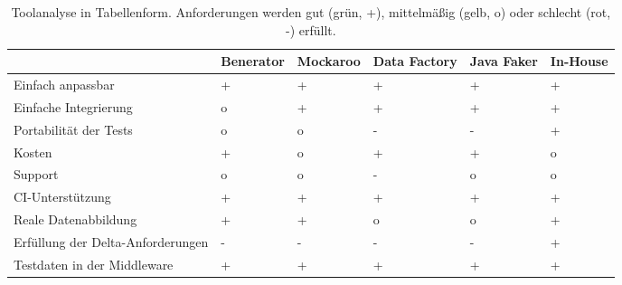 \begin{sidewaystable}[h!p]
    \begin{center}
        \begin{tabular}{| >{\raggedright\arraybackslash}m{16em} | >{\raggedright\arraybackslash}m{6em} | >{\raggedright\arraybackslash}m{6em} | >{\raggedright\arraybackslash}m{6em} | >{\raggedright\arraybackslash}m{6em} | >{\raggedright\arraybackslash}m{6em} |}
            \hline
              & Benerator & Mockaroo & Data Factory & Java Faker & In-House \\ 
             \hline\hline
             Einfach anpassbar & \cellcolor{good}+ & \cellcolor{good}+ & \cellcolor{good}+ & \cellcolor{good}+ & \cellcolor{good}+ \\ 
             \hline
             Einfache Integrierung & \cellcolor{neutral}o & \cellcolor{good}+ & \cellcolor{good}+ & \cellcolor{good}+ & \cellcolor{good}+ \\ 
             \hline
             Portabilität der Tests & \cellcolor{neutral}o & \cellcolor{neutral}o & \cellcolor{bad}- & \cellcolor{bad}- & \cellcolor{good}+ \\ 
             \hline
             Kosten & \cellcolor{good}+ & \cellcolor{neutral}o & \cellcolor{good}+ & \cellcolor{good}+ & \cellcolor{neutral}o \\ 
             \hline
             Support & \cellcolor{neutral}o & \cellcolor{neutral}o & \cellcolor{bad}- & \cellcolor{neutral}o & \cellcolor{neutral}o \\ 
             \hline
             \ac{CI}-Unterstützung & \cellcolor{good}+ & \cellcolor{good}+ & \cellcolor{good}+ & \cellcolor{good}+ & \cellcolor{good}+ \\ 
             \hline
             Reale Datenabbildung & \cellcolor{good}+ & \cellcolor{good}+ & \cellcolor{neutral}o & \cellcolor{neutral}o & \cellcolor{good}+ \\ 
             \hline
             Erfüllung der Delta-Anforderungen & \cellcolor{bad}- & \cellcolor{bad}- & \cellcolor{bad}- & \cellcolor{bad}- & \cellcolor{good}+ \\ 
             \hline
             Testdaten in der Middleware & \cellcolor{good}+ & \cellcolor{good}+ & \cellcolor{good}+ & \cellcolor{good}+ & \cellcolor{good}+ \\ 
             \hline
        \end{tabular}
        \caption[Toolanalyse in Tabellenform]{Toolanalyse in Tabellenform. Anforderungen werden gut (grün, +), mittelmäßig (gelb, o) oder schlecht (rot, -) erfüllt.}\label{tab:toolanalyse}
    \end{center}
\end{sidewaystable}

